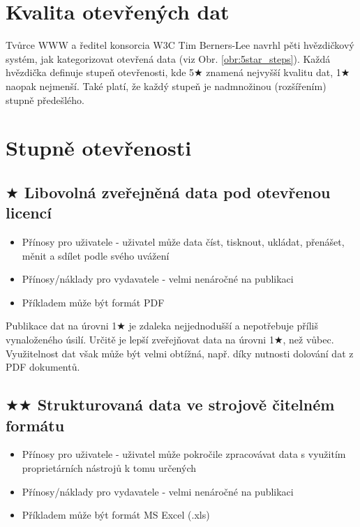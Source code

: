 \newpage

\section{Kvalita otevřených dat}

Tvůrce WWW a ředitel konsorcia W3C Tim Berners-Lee navrhl pěti hvězdičkový systém, jak kategorizovat otevřená data (viz Obr. \ref{obr:5star_steps}). Každá hvězdička definuje stupeň otevřenosti, kde 5$\bigstar$ znamená nejvyšší kvalitu dat, 1$\bigstar$ naopak nejmenší. Také platí, že každý stupeň je nadmnožinou (rozšířením) stupně předešlého.\cite{5starInfo, linkedData}

\section[Stupně otevřenosti]{Stupně otevřenosti\cite{5starInfo, linkedData}}    

\subsection*{$\bigstar$ Libovolná zveřejněná data pod otevřenou licencí}

\medskip

\begin{itemize}
\item Přínosy pro uživatele - uživatel může data číst, tisknout, ukládat, přenášet, měnit a sdílet podle svého uvážení
\item Přínosy/náklady pro vydavatele - velmi nenáročné na publikaci
\item Příkladem může být formát PDF
\end{itemize}

Publikace dat na úrovni 1$\bigstar$ je zdaleka nejjednodušší a nepotřebuje příliš vynaloženého úsilí. Určitě je lepší zveřejňovat data na úrovni 1$\bigstar$, než vůbec. Využitelnost dat však může být velmi obtížná, např. díky nutnosti dolování dat z PDF dokumentů.

\subsection*{$\bigstar\bigstar$ Strukturovaná data ve strojově čitelném formátu}

\medskip

\begin{itemize}
\item Přínosy pro uživatele - uživatel může pokročile zpracovávat data s využitím proprietárních nástrojů k tomu určených
\item Přínosy/náklady pro vydavatele - velmi nenáročné na publikaci
\item Příkladem může být formát MS Excel (.xls)
\end{itemize}

